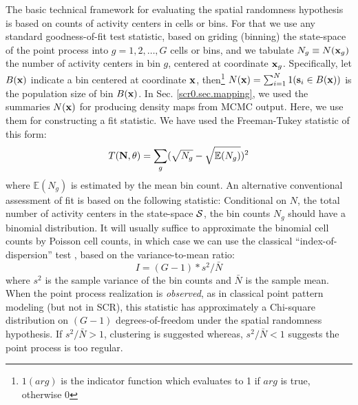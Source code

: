 {%

The basic technical framework for evaluating the spatial randomness
hypothesis is based on counts of activity centers in cells or bins.
For that we use any standard goodness-of-fit test statistic, based on
griding (binning) the state-space of the point process into
$g=1,2,\ldots,G$ cells or bins,
and we tabulate $N_{g} \equiv N({\bf
  x}_{g})$ the number of activity centers in bin $g$, centered at
coordinate ${\bf x}_{g}$.
Specifically, let $B({\bf x})$ indicate a bin centered at
coordinate ${\bf x}$, then\footnote{$1(arg)$ is the indicator function
  which evaluates to 1 if $arg$
  is true, otherwise 0} $N({\bf x})=\sum_{i=1}^{N} 1({\bf s}_{i} \in
B({\bf x}))$ is the population size of bin $B({\bf x})$.
In
Sec. \ref{scr0.sec.mapping}, we used the summaries $N({\bf x})$
for producing density maps from MCMC output. Here, we use them for
constructing a fit statistic.
We have used the 
Freeman-Tukey statistic of this form:
\[
T({\bf N}, \theta) =  \sum_{g}  (\sqrt{N_{g}} - \sqrt{\mathbb{E}(N_{g})})^{2}
\]
where $\mathbb{E}(N_{g})$ is estimated by the mean bin count.  An
alternative conventional assessment of fit is based on the following
statistic: Conditional on $N$, the total number of activity centers in
the state-space ${\cal S}$, the bin counts $N_{g}$ should have a
binomial distribution.  It will usually suffice to approximate the
binomial cell counts by Poisson cell counts, in which case we can use
the classical ``index-of-dispersion'' test
\citep[][p. 87]{illian_etal:2008}, based on the variance-to-mean ratio:
\[
   I =  (G -1)*s^2/\bar{N}
\]
where $s^{2}$ is the sample variance of the bin counts and $\bar{N}$
is the sample mean. When the point process realization is {\it
  observed}, as in classical point pattern modeling (but not in SCR),
this statistic has approximately a Chi-square distribution on $(G- 1)$ 
degrees-of-freedom under the spatial randomness
hypothesis.  If $s^2/\bar{N} > 1$, clustering is suggested whereas,
$s^2/\bar{N} <1$ suggests the point process is too regular.


}
